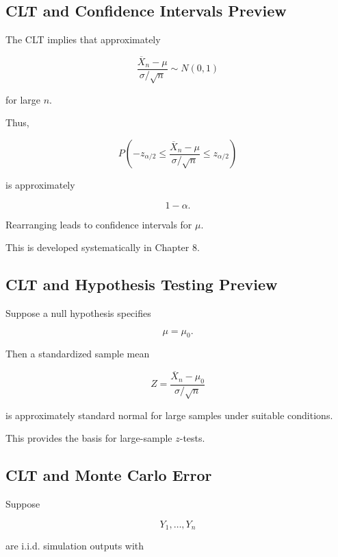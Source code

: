 \subsection{CLT and Confidence Intervals Preview}
\label{subsec:clt-confidence-interval-preview}

The CLT implies that approximately

\[
\frac{
\overline{X}_n-\mu
}{
\sigma/\sqrt{n}
}
\sim
N(0,1)
\]

for large \(n\).

Thus,

\[
P
\left(
-z_{\alpha/2}
\leq
\frac{
\overline{X}_n-\mu
}{
\sigma/\sqrt{n}
}
\leq
z_{\alpha/2}
\right)
\]

is approximately

\[
1-\alpha.
\]

Rearranging leads to confidence intervals for \(\mu\).

This is developed systematically in Chapter 8.

\subsection{CLT and Hypothesis Testing Preview}
\label{subsec:clt-hypothesis-testing-preview}

Suppose a null hypothesis specifies

\[
\mu=\mu_0.
\]

Then a standardized sample mean

\[
\boxed{
Z
=
\frac{
\overline{X}_n-\mu_0
}{
\sigma/\sqrt{n}
}
}
\]

is approximately standard normal for large samples under suitable
conditions.

This provides the basis for large-sample \(z\)-tests.

\subsection{CLT and Monte Carlo Error}
\label{subsec:clt-monte-carlo-error}

Suppose

\[
Y_1,\ldots,Y_n
\]

are i.i.d. simulation outputs with

